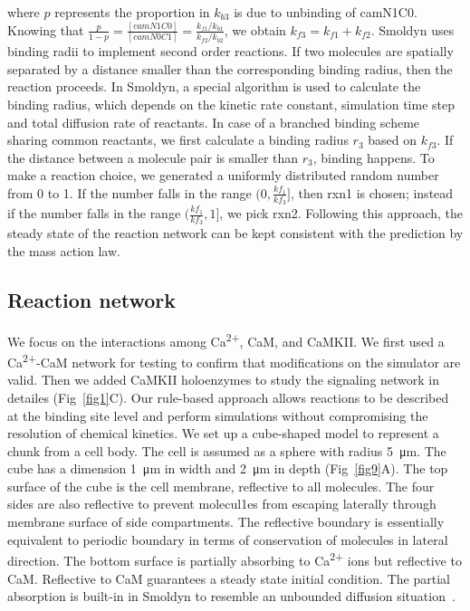 \documentclass[10pt,letterpaper]{article}
\begin{document}
where $p$ represents the proportion in $k_{b3}$ is due to unbinding of camN1C0. Knowing that $\frac{p}{1-p}=\frac{[camN1C0]}{[camN0C1]}=\frac{k_{f1}/k_{b1}}{k_{f2}/k_{b2}}$, we obtain $k_{f3}=k_{f1}+k_{f2}$. Smoldyn uses binding radii to implement second order reactions. If two molecules are spatially separated by a distance smaller than the corresponding binding radius, then the reaction proceeds. In Smoldyn, a special algorithm is used to calculate the binding radius, which depends on the kinetic rate constant, simulation time step and total diffusion rate of reactants. In case of a branched binding scheme sharing common reactants, we first calculate a binding radius $r_3$ based on $k_{f3}$. If the distance between a molecule pair is smaller than $r_3$, binding happens. To make a reaction choice, we generated a uniformly distributed random number from 0 to 1. If the number falls in the range $(0,\frac{kf_1}{kf_3}]$, then rxn1 is chosen; instead if the number falls in the range $(\frac{kf_1}{kf_3}, 1]$, we pick rxn2. Following this approach, the steady state of the reaction network can be kept consistent with the prediction by the mass action law. 

\subsection*{Reaction network}
We focus on the interactions among Ca\textsuperscript{2+}, CaM, and CaMKII. We first used a Ca\textsuperscript{2+}-CaM network for testing to confirm that modifications on the simulator are valid. Then we added CaMKII holoenzymes to study the signaling network in detailes (Fig~\ref{fig1}C). Our rule-based approach allows reactions to be described at the binding site level and perform simulations without compromising the resolution of chemical kinetics. We set up a cube-shaped model to represent a chunk from a cell body. The cell is assumed as a sphere with radius \SI{5}{\micro\meter}. The cube has a dimension \SI{1}{\um} in width and \SI{2}{\um} in depth (Fig~\ref{fig9}A). The top surface of the cube is the cell membrane, reflective to all molecules. The four sides are also reflective to prevent molecul1es from escaping laterally through membrane surface of side compartments. The reflective boundary is essentially equivalent to periodic boundary in terms of conservation of molecules in lateral direction. The bottom surface is partially absorbing to Ca\textsuperscript{2+} ions but reflective to CaM. Reflective to CaM guarantees a steady state initial condition. The partial absorption is built-in in Smoldyn to resemble an unbounded diffusion situation~\cite{Andrews:2009dr}.
\end{document}
